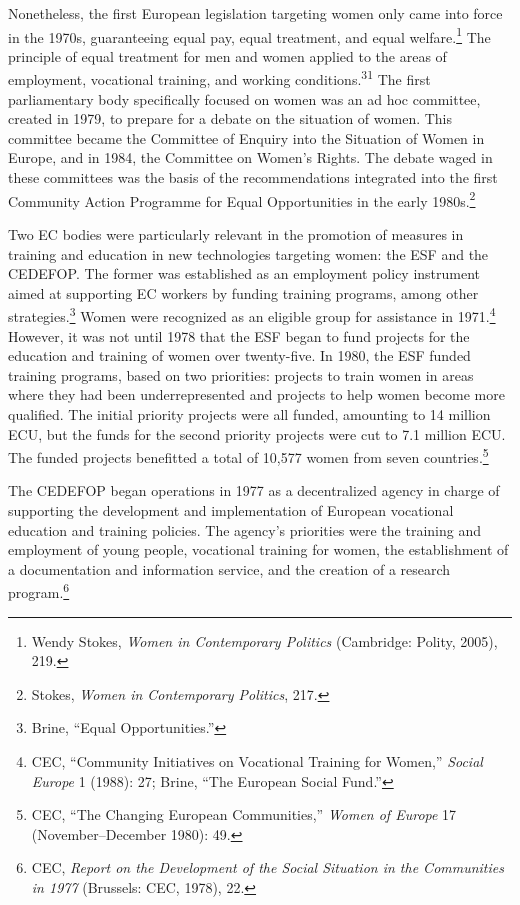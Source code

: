 \documentclass{tufte-handout}
\begin{document}
Nonetheless, the first European legislation targeting women only came
into force in the 1970s, guaranteeing equal pay, equal treatment, and
equal welfare.\footnote{Wendy Stokes, \emph{Women in Contemporary
  Politics} (Cambridge: Polity, 2005), 219.} The principle of equal
treatment for men and women applied to the areas of employment,
vocational training, and working conditions.\textsuperscript{31} The first parliamentary body specifically focused on women
was an ad hoc committee, created in 1979, to prepare for a debate on the
situation of women. This committee became the Committee of Enquiry into
the Situation of Women in Europe, and in 1984, the Committee on Women's
Rights. The debate waged in these committees was the basis of the
recommendations integrated into the first Community Action Programme for
Equal Opportunities in the early 1980s.\footnote{Stokes, \emph{Women in
  Contemporary Politics}, 217.}

Two EC bodies were particularly relevant in the promotion of measures in
training and education in new technologies targeting women: the ESF and
the CEDEFOP. The former was established as an employment policy
instrument aimed at supporting EC workers by funding training programs,
among other strategies.\footnote{Brine, ``Equal Opportunities.''} Women
were recognized as an eligible group for assistance in 1971.\footnote{CEC,
  ``Community Initiatives on Vocational Training for Women,''
  \emph{Social Europe} 1 (1988): 27; Brine, ``The European Social
  Fund.''} However, it was not until 1978 that the ESF began to fund
projects for the education and training of women over twenty-five. In
1980, the ESF funded training programs, based on two priorities:
projects to train women in areas where they had been underrepresented
and projects to help women become more qualified. The initial priority
projects were all funded, amounting to 14 million ECU, but the funds for
the second priority projects were cut to 7.1 million ECU. The funded
projects benefitted a total of 10,577 women from seven
countries.\footnote{CEC, ``The Changing European Communities,''
  \emph{Women of Europe} 17 (November--December 1980): 49.}

The CEDEFOP began operations in 1977 as a decentralized agency in charge
of supporting the development and implementation of European vocational
education and training policies. The agency's priorities were the
training and employment of young people, vocational training for women,
the establishment of a documentation and information service, and the
creation of a research program.\footnote{CEC, \emph{Report on the
  Development of the Social Situation in the Communities in 1977}
  (Brussels: CEC, 1978), 22.}
\end{document}
